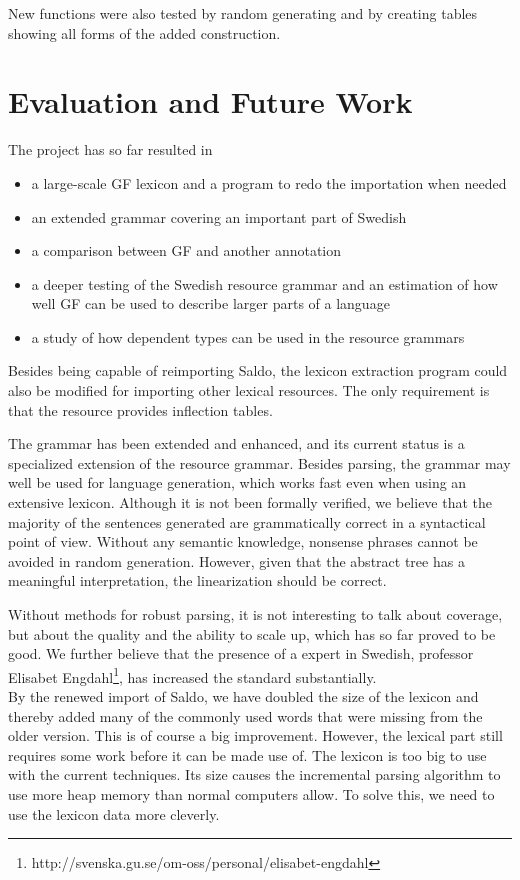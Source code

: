 \documentclass[10pt, a4paper]{article}
\begin{document}
New functions were also tested by random generating and by creating tables showing
all forms of the added construction.

\section{Evaluation and Future Work}
The project has so far resulted in
\begin{itemize}
\item a large-scale GF lexicon and a program to redo the importation when needed
\item an extended grammar covering an important part of Swedish
\item a comparison between GF and another annotation
\item a deeper testing of the Swedish resource grammar and an estimation
of how well GF can be used to describe larger parts of a language
\item a study of how dependent types can be used in the resource grammars
\end{itemize}

Besides being capable of reimporting Saldo, the lexicon extraction program could also
be modified for importing other lexical resources. The only requirement is that
the resource provides inflection tables.

The grammar has been extended and enhanced, and its current status is
a specialized extension of the resource grammar.
Besides parsing, the grammar may well be used for language generation,
which works fast even when using an extensive lexicon.
Although it is not been formally verified, we believe that the majority of the
sentences generated are grammatically correct in a syntactical point of view.
Without any semantic knowledge, nonsense phrases cannot be avoided in
random generation. However, given that the abstract tree has a meaningful
interpretation,
the linearization should be correct.

Without methods for robust parsing, %
it is not interesting to talk about coverage, but about the quality and
the ability to scale up, which has so far proved to be good.
We further believe that the presence of a expert in Swedish, professor Elisabet
Engdahl\footnote{http://svenska.gu.se/om-oss/personal/elisabet-engdahl},
has increased the standard substantially.\\

By the renewed import of Saldo, we have doubled the size of the lexicon and thereby
added many of the commonly used words that were missing from the older
version. This is of course a big improvement.
However, the lexical part still requires some work before it can be made use of.
The lexicon is too big to use with the current techniques. Its size causes the
incremental parsing algorithm to use more heap memory than normal computers
allow. To solve this, we need to use the lexicon data more cleverly.
\end{document}
